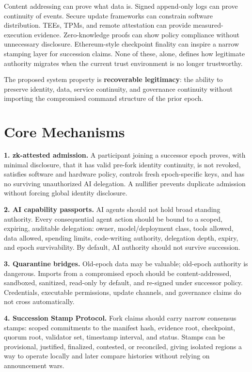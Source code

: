 \documentclass[10pt,letterpaper,twocolumn]{article}
\begin{document}
Content addressing can prove what data is. Signed append-only logs can prove continuity of events. Secure update frameworks can constrain software distribution. TEEs, TPMs, and remote attestation can provide measured-execution evidence. Zero-knowledge proofs can show policy compliance without unnecessary disclosure. Ethereum-style checkpoint finality can inspire a narrow stamping layer for succession claims. None of these, alone, defines how legitimate authority migrates when the current trust environment is no longer trustworthy.

The proposed system property is \textbf{recoverable legitimacy}: the ability to preserve identity, data, service continuity, and governance continuity without importing the compromised command structure of the prior epoch.

\section{Core Mechanisms}

\textbf{1. zk-attested admission.} A participant joining a successor epoch proves, with minimal disclosure, that it has valid pre-fork identity continuity, is not revoked, satisfies software and hardware policy, controls fresh epoch-specific keys, and has no surviving unauthorized AI delegation. A nullifier prevents duplicate admission without forcing global identity disclosure.

\textbf{2. AI capability passports.} AI agents should not hold broad standing authority. Every consequential agent action should be bound to a scoped, expiring, auditable delegation: owner, model/deployment class, tools allowed, data allowed, spending limits, code-writing authority, delegation depth, expiry, and epoch survivability. By default, AI authority should not survive succession.

\textbf{3. Quarantine bridges.} Old-epoch data may be valuable; old-epoch authority is dangerous. Imports from a compromised epoch should be content-addressed, sandboxed, sanitized, read-only by default, and re-signed under successor policy. Credentials, executable permissions, update channels, and governance claims do not cross automatically.

\textbf{4. Succession Stamp Protocol.} Fork claims should carry narrow consensus stamps: scoped commitments to the manifest hash, evidence root, checkpoint, quorum root, validator set, timestamp interval, and status. Stamps can be provisional, justified, finalized, contested, or reconciled, giving isolated regions a way to operate locally and later compare histories without relying on announcement wars.
\end{document}
